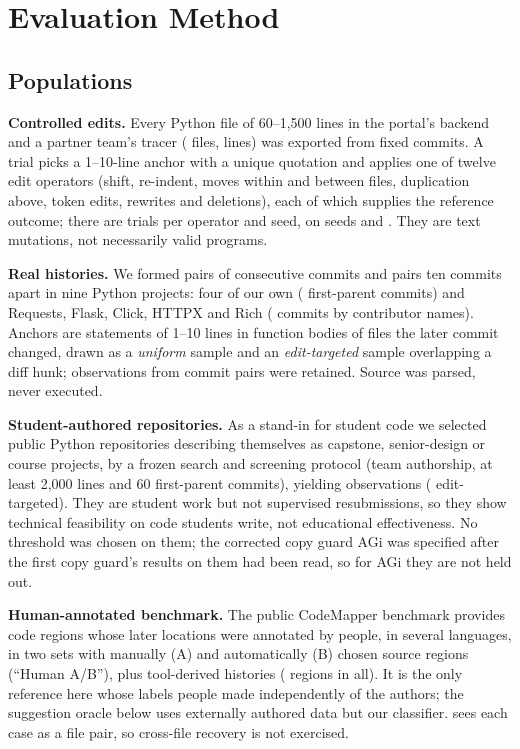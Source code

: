 \section{Evaluation Method}\label{sec:method}

\subsection{Populations}
\textbf{Controlled edits.} Every Python file of 60--1,500 lines in the portal's backend and a partner team's tracer (\nFiles{} files, \nLines{} lines) was exported from fixed commits. A trial picks a 1--10-line anchor with a unique quotation and applies one of twelve edit operators (shift, re-indent, moves within and between files, duplication above, token edits, rewrites and deletions), each of which supplies the reference outcome; there are \nPerOp{} trials per operator and seed, on seeds \seedMain{} and \seedRep. They are text mutations, not necessarily valid programs.

\textbf{Real histories.} We formed pairs of consecutive commits and pairs ten commits apart in nine Python projects: four of our own (\rOwnCommits{} first-parent commits) and Requests, Flask, Click, HTTPX and Rich (\rOssCommits{} commits by \rOssAuthors{} contributor names). Anchors are statements of 1--10 lines in function bodies of files the later commit changed, drawn as a \emph{uniform} sample and an \emph{edit-targeted} sample overlapping a diff hunk; \rN{} observations from \rPairs{} commit pairs were retained. Source was parsed, never executed.

\textbf{Student-authored repositories.} As a stand-in for student code we selected \hTwoRepos{} public Python repositories describing themselves as capstone, senior-design or course projects, by a frozen search and screening protocol (team authorship, at least 2,000 lines and 60 first-parent commits), yielding \hTwoN{} observations (\hTwoTargetedN{} edit-targeted). They are student work but not supervised resubmissions, so they show technical feasibility on code students write, not educational effectiveness. No threshold was chosen on them; the corrected copy guard AGi was specified after the first copy guard's results on them had been read, so for AGi they are not held out.

\textbf{Human-annotated benchmark.} The public CodeMapper benchmark \cite{hu2026codemapper} provides \cExtHumN{} code regions whose later locations were annotated by people, in several languages, in two sets with manually (A) and automatically (B) chosen source regions (``Human A/B''), plus tool-derived histories (\cExtExtN{} regions in all). It is the only reference here whose labels people made independently of the authors; the suggestion oracle below uses externally authored data but our classifier. \sys{} sees each case as a file pair, so cross-file recovery is not exercised.

